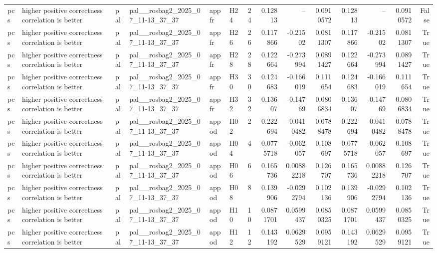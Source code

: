 \begin{longtable}{llllllrrrrrrrr}
pcs & higher positive correctness correlation is better & pal & pal\_\_rosbag2\_2025\_07\_11-13\_37\_37 & appfr & H24 & 24 & 0.12813 & -- & 0.0910572 & 0.12813 & -- & 0.0910572 & False \\
pcs & higher positive correctness correlation is better & pal & pal\_\_rosbag2\_2025\_07\_11-13\_37\_37 & appfr & H26 & 26 & 0.117866 & -0.21502 & 0.0811307 & 0.117866 & -0.21502 & 0.0811307 & True \\
pcs & higher positive correctness correlation is better & pal & pal\_\_rosbag2\_2025\_07\_11-13\_37\_37 & appfr & H28 & 28 & 0.122664 & -0.273994 & 0.0891427 & 0.122664 & -0.273994 & 0.0891427 & True \\
pcs & higher positive correctness correlation is better & pal & pal\_\_rosbag2\_2025\_07\_11-13\_37\_37 & appfr & H30 & 30 & 0.124683 & -0.166019 & 0.111654 & 0.124683 & -0.166019 & 0.111654 & True \\
pcs & higher positive correctness correlation is better & pal & pal\_\_rosbag2\_2025\_07\_11-13\_37\_37 & appfr & H32 & 32 & 0.13607 & -0.14769 & 0.0806834 & 0.13607 & -0.14769 & 0.0806834 & True \\
pcs & higher positive correctness correlation is better & pal & pal\_\_rosbag2\_2025\_07\_11-13\_37\_37 & appod & H02 & 2 & 0.222694 & -0.0410482 & 0.0788478 & 0.222694 & -0.0410482 & 0.0788478 & True \\
pcs & higher positive correctness correlation is better & pal & pal\_\_rosbag2\_2025\_07\_11-13\_37\_37 & appod & H04 & 4 & 0.0775718 & -0.062057 & 0.108697 & 0.0775718 & -0.062057 & 0.108697 & True \\
pcs & higher positive correctness correlation is better & pal & pal\_\_rosbag2\_2025\_07\_11-13\_37\_37 & appod & H06 & 6 & 0.165736 & 0.00882218 & 0.126707 & 0.165736 & 0.00882218 & 0.126707 & True \\
pcs & higher positive correctness correlation is better & pal & pal\_\_rosbag2\_2025\_07\_11-13\_37\_37 & appod & H08 & 8 & 0.139906 & -0.0292794 & 0.102136 & 0.139906 & -0.0292794 & 0.102136 & True \\
pcs & higher positive correctness correlation is better & pal & pal\_\_rosbag2\_2025\_07\_11-13\_37\_37 & appod & H10 & 10 & 0.0871701 & 0.0599437 & 0.0850325 & 0.0871701 & 0.0599437 & 0.0850325 & True \\
pcs & higher positive correctness correlation is better & pal & pal\_\_rosbag2\_2025\_07\_11-13\_37\_37 & appod & H12 & 12 & 0.143192 & 0.0629529 & 0.0959121 & 0.143192 & 0.0629529 & 0.0959121 & True \\

\end{longtable}
